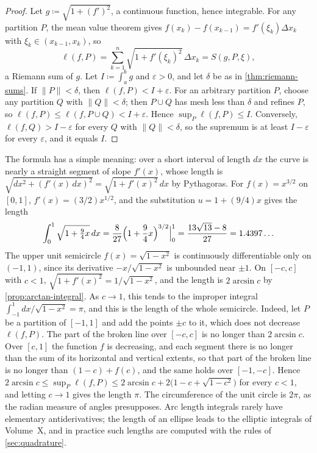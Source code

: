 \begin{proof}
Let $g\coloneqq\sqrt{1+(f')^2}$, a continuous function, hence integrable. For any partition $P$, the mean value theorem gives $f(x_k)-f(x_{k-1})=f'(\xi_k)\Delta x_k$ with $\xi_k\in(x_{k-1},x_k)$, so
\[
\ell(f,P)=\sum_{k=1}^n\sqrt{1+f'(\xi_k)^2}\,\Delta x_k=S(g,P,\xi),
\]
a Riemann sum of $g$. Let $I\coloneqq\int_a^bg$ and $\varepsilon>0$, and let $\delta$ be as in \cref{thm:riemann-sums}. If $\|P\|<\delta$, then $\ell(f,P)<I+\varepsilon$. For an arbitrary partition $P$, choose any partition $Q$ with $\|Q\|<\delta$; then $P\cup Q$ has mesh less than $\delta$ and refines $P$, so $\ell(f,P)\le\ell(f,P\cup Q)<I+\varepsilon$. Hence $\sup_P\ell(f,P)\le I$. Conversely, $\ell(f,Q)>I-\varepsilon$ for every $Q$ with $\|Q\|<\delta$, so the supremum is at least $I-\varepsilon$ for every $\varepsilon$, and it equals $I$.
\end{proof}

The formula has a simple meaning: over a short interval of length $dx$ the curve is nearly a straight segment of slope $f'(x)$, whose length is $\sqrt{dx^2+(f'(x)\,dx)^2}=\sqrt{1+f'(x)^2}\,dx$ by Pythagoras. For $f(x)=x^{3/2}$ on $[0,1]$, $f'(x)=(3/2)x^{1/2}$, and the substitution $u=1+(9/4)x$ gives the length
\[
\int_0^1\sqrt{1+\tfrac94x}\,dx=\frac8{27}\Bigl(1+\frac94x\Bigr)^{3/2}\Big|_0^1=\frac{13\sqrt{13}-8}{27}=1.4397\ldots
\]
The upper unit semicircle $f(x)=\sqrt{1-x^2}$ is continuously differentiable only on $(-1,1)$, since its derivative $-x/\sqrt{1-x^2}$ is unbounded near $\pm1$. On $[-c,c]$ with $c<1$, $\sqrt{1+f'(x)^2}=1/\sqrt{1-x^2}$, and the length is $2\arcsin c$ by \cref{prop:arctan-integral}. As $c\to1$, this tends to the improper integral $\int_{-1}^1dx/\sqrt{1-x^2}=\pi$, and this is the length of the whole semicircle. Indeed, let $P$ be a partition of $[-1,1]$ and add the points $\pm c$ to it, which does not decrease $\ell(f,P)$. The part of the broken line over $[-c,c]$ is no longer than $2\arcsin c$. Over $[c,1]$ the function $f$ is decreasing, and each segment there is no longer than the sum of its horizontal and vertical extents, so that part of the broken line is no longer than $(1-c)+f(c)$, and the same holds over $[-1,-c]$. Hence $2\arcsin c\le\sup_P\ell(f,P)\le2\arcsin c+2\bigl(1-c+\sqrt{1-c^2}\bigr)$ for every $c<1$, and letting $c\to1$ gives the length $\pi$. The circumference of the unit circle is $2\pi$, as the radian measure of angles presupposes. Arc length integrals rarely have elementary antiderivatives; the length of an ellipse leads to the elliptic integrals of Volume~X, and in practice such lengths are computed with the rules of \cref{sec:quadrature}.


